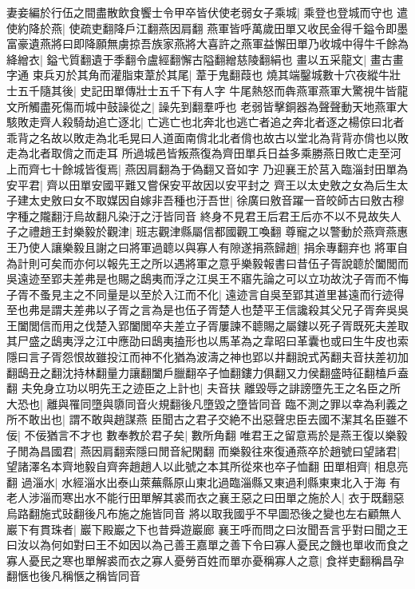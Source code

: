 妻妾編於行伍之間盡散飲食饗士令甲卒皆伏使老弱女子乘城|{
	乘登也登城而守也}
遣使約降於燕|{
	使疏吏翻降戶江翻燕因肩翻}
燕軍皆呼萬歲田單又收民金得千鎰令即墨富豪遺燕將曰即降願無虜掠吾族家燕將大喜許之燕軍益懈田單乃收城中得牛千餘為絳繒衣|{
	鎰弋質翻遺于季翻令盧經翻懈古隘翻繒慈陵翻絹也}
畫以五采龍文|{
	畫古畫字通}
束兵刃於其角而灌脂束葦於其尾|{
	葦于鬼翻葭也}
燒其端鑿城數十穴夜縱牛壯士五千隨其後|{
	史記田單傳壯士五千下有人字}
牛尾熱怒而犇燕軍燕軍大驚視牛皆龍文所觸盡死傷而城中鼓譟從之|{
	譟先到翻羣呼也}
老弱皆擊銅器為聲聲動天地燕軍大駭敗走齊人殺騎劫追亡逐北|{
	亡逃亡也北奔北也逃亡者追之奔北者逐之楊倞曰北者乖背之名故以敗走為北毛晃曰人道面南偝北北者偝也故古以堂北為背背亦偝也以敗走為北者取偝之而走耳}
所過城邑皆叛燕復為齊田單兵日益多乘勝燕日敗亡走至河上而齊七十餘城皆復焉|{
	燕因肩翻為于偽翻又音如字}
乃迎襄王於莒入臨淄封田單為安平君|{
	齊以田單安國平難又嘗保安平故因以安平封之}
齊王以太史敫之女為后生太子建太史敫曰女不取媒因自嫁非吾種也汙吾世|{
	徐廣曰敫音躍一音皎師古曰敫古穆字種之隴翻汙烏故翻凡染汙之汙皆同音}
終身不見君王后君王后亦不以不見故失人子之禮趙王封樂毅於觀津|{
	班志觀津縣屬信都國觀工喚翻}
尊寵之以警動於燕齊燕惠王乃使人讓樂毅且謝之曰將軍過聼以與寡人有隙遂捐燕歸趙|{
	捐余專翻弃也}
將軍自為計則可矣而亦何以報先王之所以遇將軍之意乎樂毅報書曰昔伍子胥說聼於闔閭而吳遠迹至郢夫差弗是也賜之鴟夷而浮之江吳王不寤先論之可以立功故沈子胥而不悔子胥不蚤見主之不同量是以至於入江而不化|{
	遠迹言自吳至郢其道里甚遠而行迹得至也弗是謂夫差弗以子胥之言為是也伍子胥楚人也楚平王信讒殺其父兄子胥奔吳吳王闔閭信而用之伐楚入郢闔閭卒夫差立子胥屢諫不聼賜之屬鏤以死子胥既死夫差取其尸盛之鴟夷浮之江中應劭曰鴟夷搕形也以馬革為之韋昭曰革囊也或曰生牛皮也索隱曰言子胥怨恨故雖投江而神不化猶為波濤之神也郢以井翻說式芮翻夫音扶差初加翻鴟丑之翻沈持林翻量力讓翻闔戶臘翻卒子恤翻鏤力俱翻又力侯翻盛時征翻榼戶盍翻}
夫免身立功以明先王之迹臣之上計也|{
	夫音扶}
離毀辱之誹謗墮先王之名臣之所大恐也|{
	離與罹同墮與隳同音火規翻後凡墮毀之墮皆同音}
臨不測之罪以幸為利義之所不敢出也|{
	謂不敢與趙謀燕}
臣聞古之君子交絶不出惡聲忠臣去國不潔其名臣雖不佞|{
	不佞猶言不才也}
數奉教於君子矣|{
	數所角翻}
唯君王之留意焉於是燕王復以樂毅子閒為昌國君|{
	燕因肩翻索隱曰閒音紀閑翻}
而樂毅往來復通燕卒於趙號曰望諸君|{
	望諸澤名本齊地毅自齊奔趙趙人以此號之本其所從來也卒子恤翻}
田單相齊|{
	相息亮翻}
過淄水|{
	水經淄水出泰山萊蕪縣原山東北過臨淄縣又東過利縣東東北入于海}
有老人涉淄而寒出水不能行田單解其裘而衣之襄王惡之曰田單之施於人|{
	衣于既翻惡烏路翻施式䜴翻後凡布施之施皆同音}
將以取我國乎不早圖恐後之變也左右顧無人巖下有貫珠者|{
	巖下殿巖之下也昔舜遊巖廊}
襄王呼而問之曰汝聞吾言乎對曰聞之王曰汝以為何如對曰王不如因以為己善王嘉單之善下令曰寡人憂民之饑也單收而食之寡人憂民之寒也單解裘而衣之寡人憂勞百姓而單亦憂稱寡人之意|{
	食祥吏翻稱昌孕翻愜也後凡稱愜之稱皆同音}
